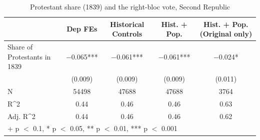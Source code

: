 \begin{table}
\centering
\caption{Protestant share (1839) and the right-bloc vote, Second Republic}
\centering
\begin{tabular}[t]{lcccc}
\toprule
  & Dep FEs & Historical Controls & Hist. + Pop. & Hist. + Pop. (Original only)\\
\midrule
Share of Protestants in 1839 & \num{-0.065}*** & \num{-0.061}*** & \num{-0.061}*** & \num{-0.024}*\\
 & (\num{0.009}) & (\num{0.009}) & (\num{0.009}) & (\num{0.011})\\
\midrule
N & \num{54498} & \num{47688} & \num{47688} & \num{3764}\\
R\textasciicircum{}2 & \num{0.44} & \num{0.46} & \num{0.46} & \num{0.63}\\
Adj. R\textasciicircum{}2 & \num{0.44} & \num{0.46} & \num{0.46} & \num{0.62}\\
\bottomrule
\multicolumn{5}{l}{\rule{0pt}{1em}+ p $<$ 0.1, * p $<$ 0.05, ** p $<$ 0.01, *** p $<$ 0.001}\\
\end{tabular}
\end{table}
